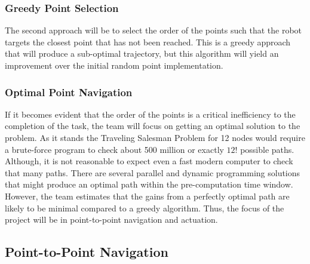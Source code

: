 \documentclass[12pt,conference,onecolumn]{article} %
\begin{document}
\subsubsection*{Greedy Point Selection}
The second approach will be to select the order of the points such that the robot targets the closest point that has not been reached. This is a greedy approach that will produce a sub-optimal trajectory, but this algorithm will yield an improvement over the initial random point implementation.
\subsubsection*{Optimal Point Navigation}
If it becomes evident that the order of the points is a critical inefficiency to the completion of the task, the team will focus on getting an optimal solution to the problem. As it stands the Traveling Salesman Problem for 12 nodes would require a brute-force program to check about 500 million or exactly $12!$ possible paths. Although, it is not reasonable to expect even a fast modern computer to check that many paths. There are several parallel and dynamic programming solutions that might produce an optimal path within the pre-computation time window. However, the team estimates that the gains from a perfectly optimal path are likely to be minimal compared to a greedy algorithm. Thus, the focus of the project will be in point-to-point navigation and actuation.


\subsection*{Point-to-Point Navigation}
\end{document}
